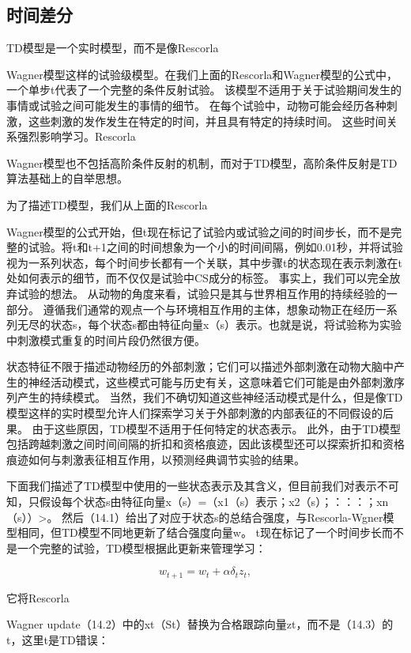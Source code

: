 {{{{{{{{{{{{\subsection{时间差分}

TD模型是一个实时模型，而不是像Rescorla{Wagner模型这样的试验级模型。在我们上面的Rescorla和Wagner模型的公式中，一个单步t代表了一个完整的条件反射试验。
该模型不适用于关于试验期间发生的事情或试验之间可能发生的事情的细节。
在每个试验中，动物可能会经历各种刺激，这些刺激的发作发生在特定的时间，并且具有特定的持续时间。
这些时间关系强烈影响学习。Rescorla{Wagner模型也不包括高阶条件反射的机制，而对于TD模型，高阶条件反射是TD算法基础上的自举思想。
	
	
	
为了描述TD模型，我们从上面的Rescorla{Wagner模型的公式开始，但t现在标记了试验内或试验之间的时间步长，而不是完整的试验。将t和t+1之间的时间想象为一个小的时间间隔，例如0.01秒，并将试验视为一系列状态，每个时间步长都有一个关联，其中步骤t的状态现在表示刺激在t处如何表示的细节，而不仅仅是试验中CS成分的标签。
事实上，我们可以完全放弃试验的想法。
从动物的角度来看，试验只是其与世界相互作用的持续经验的一部分。
遵循我们通常的观点一个与环境相互作用的主体，想象动物正在经历一系列无尽的状态s，每个状态s都由特征向量x（s）表示。也就是说，将试验称为实验中刺激模式重复的时间片段仍然很方便。


状态特征不限于描述动物经历的外部刺激；它们可以描述外部刺激在动物大脑中产生的神经活动模式，这些模式可能与历史有关，这意味着它们可能是由外部刺激序列产生的持续模式。
当然，我们不确切知道这些神经活动模式是什么，但是像TD模型这样的实时模型允许人们探索学习关于外部刺激的内部表征的不同假设的后果。
由于这些原因，TD模型不适用于任何特定的状态表示。
此外，由于TD模型包括跨越刺激之间时间间隔的折扣和资格痕迹，因此该模型还可以探索折扣和资格痕迹如何与刺激表征相互作用，以预测经典调节实验的结果。


下面我们描述了TD模型中使用的一些状态表示及其含义，但目前我们对表示不可知，只假设每个状态s由特征向量x（s）=（x1（s）表示；x2（s）；：：：；xn（s））>。
然后（14.1）给出了对应于状态s的总结合强度，与Rescorla-Wgner模型相同，但TD模型不同地更新了结合强度向量w。
t现在标记了一个时间步长而不是一个完整的试验，TD模型根据此更新来管理学习：

\begin{equation}\label{key}
	w_{t+1} = w_t + \alpha \delta_t z_t,
\end{equation}

它将Rescorla{Wagner update（14.2）中的xt（St）替换为合格跟踪向量zt，而不是（14.3）的t，这里t是TD错误：
	
}}}}}}}}}}}}}}}}

